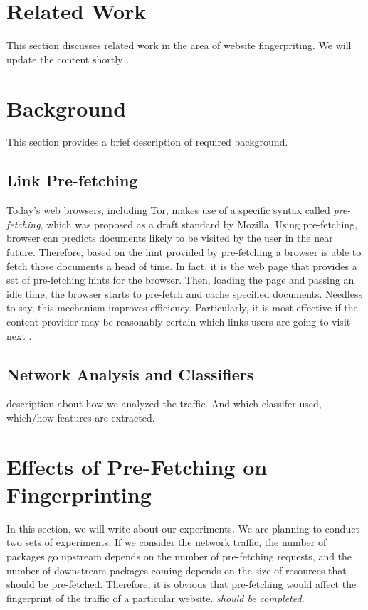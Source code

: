\documentclass{sig-alternate-05-2015}
\begin{document}
\section{Related Work}
This section discusses related work in the area of website fingerpriting. We will update the content shortly \cite{Dyer:2012:PIS:2310656.2310689, panchenko11, wang2013improved, kopf2013preventing}.

\section{Background}
This section provides a brief description of required background.

\subsection{Link Pre-fetching}
 Today's web browsers, including Tor, makes use of a specific syntax called \emph{pre-fetching}, which was proposed as a draft standard by Mozilla. Using pre-fetching, browser can predicts documents likely to be visited by the user in the near future. Therefore, based on the hint provided by pre-fetching a browser is able to fetch those documents a head of time. In fact, it is the web page that provides a set of pre-fetching hints for the browser. Then, loading the page and passing an idle time, the browser starts to pre-fetch and cache specified documents. Needless to say, this mechanism improves efficiency. Particularly, it is most effective if the content provider may be reasonably certain which links users are going to visit next \cite{wikiPreF}.

 \subsection{Network Analysis and Classifiers}
 description about how we analyzed the traffic. And which classifer used, which/how features are extracted.

\section{Effects of Pre-Fetching on Fingerprinting}
In this section, we will write  about our experiments. We are planning to conduct two sets of experiments. If we consider the network traffic, the number of packages go upstream depends on the number of pre-fetching requests, and the number of downstream packages coming depends on the size of resources that should be pre-fetched. Therefore, it is obvious that pre-fetching would affect the fingerprint of the traffic of a particular website.  \emph{should be completed.}
\end{document}
